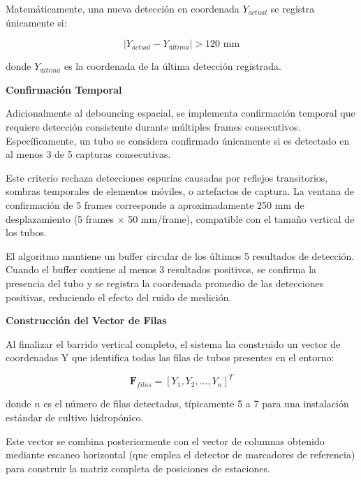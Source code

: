 Matemáticamente, una nueva detección en coordenada $Y_{actual}$ se registra únicamente si:

\begin{equation}
|Y_{actual} - Y_{última}| > 120 \text{ mm}
\end{equation}

donde $Y_{última}$ es la coordenada de la última detección registrada.

\textbf{Confirmación Temporal}

Adicionalmente al debouncing espacial, se implementa confirmación temporal que requiere detección consistente durante múltiples frames consecutivos. Específicamente, un tubo se considera confirmado únicamente si es detectado en al menos 3 de 5 capturas consecutivas.

Este criterio rechaza detecciones espurias causadas por reflejos transitorios, sombras temporales de elementos móviles, o artefactos de captura. La ventana de confirmación de 5 frames corresponde a aproximadamente 250 mm de desplazamiento (5 frames × 50 mm/frame), compatible con el tamaño vertical de los tubos.

El algoritmo mantiene un buffer circular de los últimos 5 resultados de detección. Cuando el buffer contiene al menos 3 resultados positivos, se confirma la presencia del tubo y se registra la coordenada promedio de las detecciones positivas, reduciendo el efecto del ruido de medición.

\textbf{Construcción del Vector de Filas}

Al finalizar el barrido vertical completo, el sistema ha construido un vector de coordenadas Y que identifica todas las filas de tubos presentes en el entorno:

\begin{equation}
\mathbf{F}_{filas} = [Y_1, Y_2, ..., Y_n]^T
\end{equation}

donde $n$ es el número de filas detectadas, típicamente 5 a 7 para una instalación estándar de cultivo hidropónico.

Este vector se combina posteriormente con el vector de columnas obtenido mediante escaneo horizontal (que emplea el detector de marcadores de referencia) para construir la matriz completa de posiciones de estaciones.